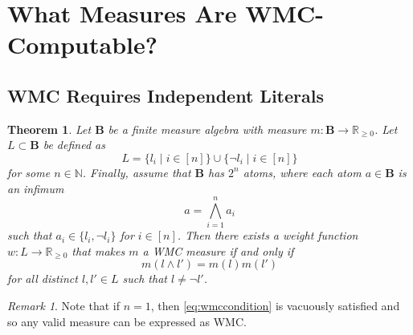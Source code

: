 \documentclass{article}
\newtheorem{theorem}{Theorem}
\theoremstyle{definition}
\theoremstyle{remark}
\newtheorem*{remark}{Remark}
\begin{document}
\section{What Measures Are WMC-Computable?}


\subsection{WMC Requires Independent Literals}


\begin{theorem}
  Let $\mathbf{B}$ be a finite measure algebra with measure $m\colon \mathbf{B} \to
  \mathbb{R}_{\ge 0}$. Let $L \subset \mathbf{B}$ be defined as
  \[
  L = \{ l_i \mid i \in [n] \} \cup \{ \neg l_i \mid i \in [n] \}
  \]
  for some $n \in \mathbb{N}$. Finally, assume that $\mathbf{B}$ has $2^n$
  atoms, where each atom $a \in \mathbf{B}$ is an infimum
  \[
    a = \bigwedge_{i=1}^n a_i
  \]
  such that $a_i \in \{ l_i, \neg l_i \}$ for $i \in [n]$. Then there exists a
  weight function $w\colon L \to \mathbb{R}_{\ge 0}$ that makes $m$ a WMC measure if
  and only if
  \begin{equation} \label{eq:wmccondition}
  m(l \land l') = m(l)m(l')
  \end{equation}
  for all distinct $l, l' \in L$ such that $l \ne \neg l'$.
\end{theorem}

\begin{remark}
  Note that if $n = 1$, then \cref{eq:wmccondition} is vacuously satisfied and
  so any valid measure can be expressed as WMC.
\end{remark}
\end{document}
